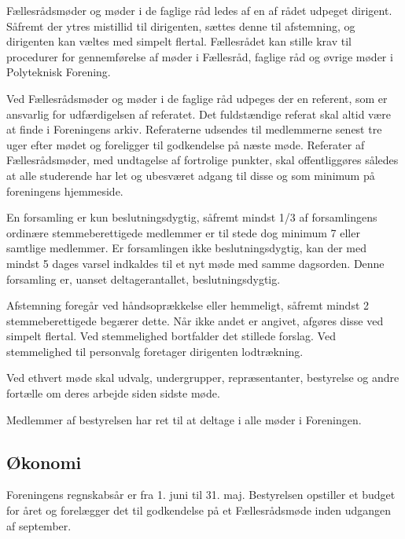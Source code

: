 \begin{list}
\item  Fællesrådsmøder og møder i de faglige råd ledes af en af rådet udpeget dirigent. Såfremt der ytres mistillid til dirigenten, sættes denne til afstemning, og dirigenten kan væltes med simpelt flertal. Fællesrådet kan stille krav til procedurer for gennemførelse af møder i Fællesråd, faglige råd og øvrige møder i Polyteknisk Forening.

\item  Ved Fællesrådsmøder og møder i de faglige råd udpeges der en referent, som er ansvarlig for udfærdigelsen af referatet. Det fuldstændige referat skal altid være at finde i Foreningens arkiv. Referaterne udsendes til medlemmerne senest tre uger efter mødet og foreligger til godkendelse på næste møde. Referater af Fællesrådsmøder, med undtagelse af fortrolige punkter, skal offentliggøres således at alle studerende har let og ubesværet adgang til disse og som minimum på foreningens hjemmeside.

\item  En forsamling er kun beslutningsdygtig, såfremt mindst 1/3 af forsamlingens ordinære stemmeberettigede medlemmer er til stede dog minimum 7 eller samtlige medlemmer. Er forsamlingen ikke beslutningsdygtig, kan der med mindst 5 dages varsel indkaldes til et nyt møde med samme dagsorden. Denne forsamling er, uanset deltagerantallet, beslutningsdygtig.

\item  Afstemning foregår ved håndsoprækkelse eller hemmeligt, såfremt mindst 2 stemmeberettigede begærer dette. Når ikke andet er angivet, afgøres disse ved simpelt flertal. Ved stemmelighed bortfalder det stillede forslag. Ved stemmelighed til personvalg foretager dirigenten lodtrækning.

\item  Ved ethvert møde skal udvalg, undergrupper, repræsentanter, bestyrelse og andre fortælle om deres arbejde siden sidste møde.

\item  Medlemmer af bestyrelsen har ret til at deltage i alle møder i Foreningen.


\subsection{Økonomi}
\label{S:Kap:oekonomi}
\item  Foreningens regnskabsår er fra 1. juni til 31. maj. Bestyrelsen opstiller et budget for året og forelægger det til godkendelse på et Fællesrådsmøde inden udgangen af september.


\end{list}
